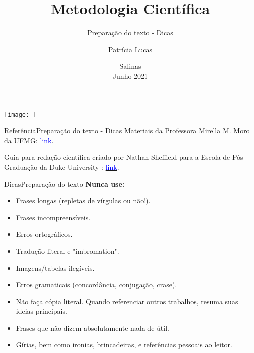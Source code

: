 \documentclass[t]{beamer}
\title[]{Metodologia Científica}
\subtitle[]{Preparação do texto - Dicas}
\author[]{Patrícia Lucas\\{\footnotesize }}
\institute{Bacharelado em Sistemas de Informação \\ IFNMG  - Campus Salinas}
\date{\scriptsize Salinas\\Junho 2021}
\begin{document}
\begin{frame}

\begin{center}
\texttt{[image: ]}
\end{center}
  \titlepage
\end{frame}


\begin{ftst}{Referência}{Preparação do texto - Dicas}
\vone
Materiais da Professora Mirella M. Moro da UFMG: \href{https://homepages.dcc.ufmg.br/~mirella/doku.php.}{\textcolor{blue}{link}}.

\vone
Guia para redação científica criado por Nathan Sheffield para a Escola de Pós-Graduação da Duke University : \href{https://sites.duke.edu/scientificwriting/}{\textcolor{blue}{link}}.

\end{ftst}


\begin{ftst}{Dicas}{Preparação do texto}
\justifying
\textbf{Nunca use:}
\vone

\begin{itemize}
    \item Frases longas (repletas de vírgulas ou não!).
    \item Frases incompreensíveis.
    \item Erros ortográficos.
    \item Tradução literal e "imbromation".
    \item Imagens/tabelas ilegíveis.
    \item Erros gramaticais (concordância, conjugação, crase).
    \item Não faça cópia literal. Quando referenciar outros trabalhos, resuma suas ideias principais.
    \item Frases que não dizem absolutamente nada de útil.
    \item Gírias, bem como ironias, brincadeiras, e referências pessoais ao leitor.
\end{itemize}

\end{ftst}
\end{document}
